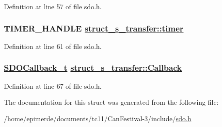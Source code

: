 Definition at line 57 of file sdo.h.\hypertarget{structstruct__s__transfer_5ef26fb9ec5de7702471923586933a1a}{
\subsubsection[timer]{\setlength{\rightskip}{0pt plus 5cm}TIMER\_\-HANDLE \hyperlink{structstruct__s__transfer_5ef26fb9ec5de7702471923586933a1a}{struct\_\-s\_\-transfer::timer}}}
\label{structstruct__s__transfer_5ef26fb9ec5de7702471923586933a1a}




Definition at line 61 of file sdo.h.\hypertarget{structstruct__s__transfer_e32787d562569a71aa8f9633e3d34ca0}{
\subsubsection[Callback]{\setlength{\rightskip}{0pt plus 5cm}\hyperlink{sdo_8h_606eccfef67e572723e1efba3f0d87ba}{SDOCallback\_\-t} \hyperlink{structstruct__s__transfer_e32787d562569a71aa8f9633e3d34ca0}{struct\_\-s\_\-transfer::Callback}}}
\label{structstruct__s__transfer_e32787d562569a71aa8f9633e3d34ca0}




Definition at line 67 of file sdo.h.

The documentation for this struct was generated from the following file:\begin{CompactItemize}
\item 
/home/epimerde/documents/tc11/Can\-Festival-3/include/\hyperlink{sdo_8h}{sdo.h}\end{CompactItemize}
